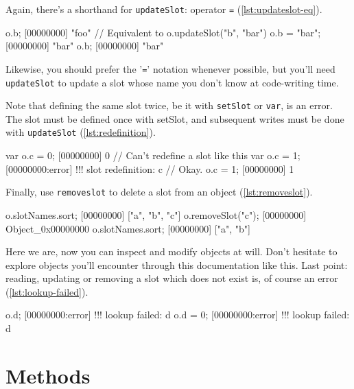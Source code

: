 Again, there's a shorthand for \texttt{updateSlot}: operator
\texttt{=} (\autoref{lst:updateslot-eq}).

\begin{urbiscript}[caption=Updating a slot with '\texttt{=}',
  label=lst:updateslot-eq, name=object-slots]
o.b;
[00000000] "foo"
// Equivalent to o.updateSlot("b", "bar")
o.b = "bar";
[00000000] "bar"
o.b;
[00000000] "bar"
\end{urbiscript}

Likewise, you should prefer the '\texttt{=}' notation whenever
possible, but you'll need \texttt{updateSlot} to update a slot whose
name you don't know at code-writing time.

Note that defining the same slot twice, be it with \texttt{setSlot} or
\texttt{var}, is an error. The slot must be defined once with setSlot,
and subsequent writes must be done with \texttt{updateSlot}
(\autoref{lst:redefinition}).

\begin{urbiscript}[caption=Defining a slot twice is an error,
  label=lst:redefinition, name=object-slots]
var o.c = 0;
[00000000] 0
// Can't redefine a slot like this
var o.c = 1;
[00000000:error] !!! slot redefinition: c
// Okay.
o.c = 1;
[00000000] 1
\end{urbiscript}

Finally, use \lstinline{removeslot} to delete a slot from an object
(\autoref{lst:removeslot}).

\begin{urbiscript}[caption=Removing a slot, label=lst:removeslot,
  name=object-slots]
o.slotNames.sort;
[00000000] ["a", "b", "c"]
o.removeSlot("c");
[00000000] Object_0x00000000
o.slotNames.sort;
[00000000] ["a", "b"]
\end{urbiscript}

Here we are, now you can inspect and modify objects at will. Don't
hesitate to explore \urbi objects you'll encounter through this
documentation like this. Last point: reading, updating or removing a
slot which does not exist is, of course an error
(\autoref{lst:lookup-failed}).

\begin{urbiscript}[caption=Manipulating nonexistent slot is an error,
  label=lst:lookup-failed, name=object-slots]
o.d;
[00000000:error] !!! lookup failed: d
o.d = 0;
[00000000:error] !!! lookup failed: d
\end{urbiscript}

\section{Methods}

